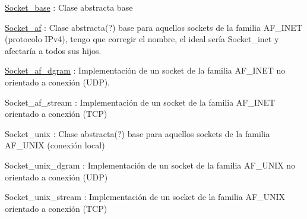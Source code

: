 \begin{DoxyItemize}
\item \hyperlink{classSocket__base}{Socket\+\_\+base} \+: Clase abstracta base
\begin{DoxyItemize}
\item \hyperlink{classSocket__af}{Socket\+\_\+af} \+: Clase abstracta(?) base para aquellos sockets de la familia A\+F\+\_\+\+I\+N\+ET (protocolo I\+Pv4), tengo que corregir el nombre, el ideal sería {\ttfamily Socket\+\_\+inet} y afectaría a todos sus hijos.
\begin{DoxyItemize}
\item \hyperlink{classSocket__af__dgram}{Socket\+\_\+af\+\_\+dgram} \+: Implementación de un socket de la familia A\+F\+\_\+\+I\+N\+ET no orientado a conexión (U\+DP).
\item Socket\+\_\+af\+\_\+stream \+: Implementación de un socket de la familia A\+F\+\_\+\+I\+N\+ET orientado a conexión (T\+CP)
\end{DoxyItemize}
\item Socket\+\_\+unix \+: Clase abstracta(?) base para aquellos sockets de la familia A\+F\+\_\+\+U\+N\+IX (conexión local)
\begin{DoxyItemize}
\item Socket\+\_\+unix\+\_\+dgram \+: Implementación de un socket de la familia A\+F\+\_\+\+U\+N\+IX no orientado a conexión (U\+DP)
\item Socket\+\_\+unix\+\_\+stream \+: Implementación de un socket de la familia A\+F\+\_\+\+U\+N\+IX orientado a conexión (T\+CP) 
\end{DoxyItemize}
\end{DoxyItemize}
\end{DoxyItemize}
